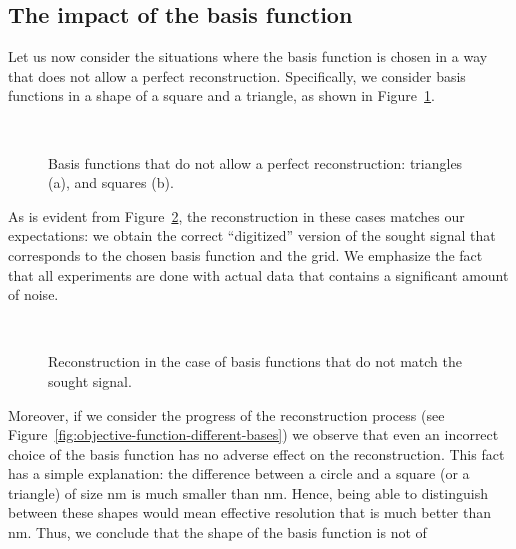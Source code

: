 \subsection{The impact of the basis function}
\label{sec:impact-basis-funct}
Let us now consider the situations where the basis function is
chosen in a way that does not allow a perfect
reconstruction. Specifically, we consider basis functions in a shape
of a square and a triangle, as shown in
Figure~\ref{fig:square-triangle-imposed}.
\begin{figure}[H]
  \centering
   \\
  \caption[Basis functions that do not allow a perfect
    reconstruction]{Basis functions that do not allow a perfect
    reconstruction: triangles (a), and squares (b).}
  \label{fig:square-triangle-imposed}
\end{figure}
As is evident from Figure~\ref{fig:square-triangle-reconstruction},
the reconstruction in these cases matches our expectations:
we obtain the correct ``digitized'' version of the sought signal that
corresponds to the chosen basis function and the grid. We emphasize the
fact that all experiments are done with actual data that contains a
significant amount of noise.
\begin{figure}[H]
  \centering
  \\
  \caption{Reconstruction in the case of basis functions that do not
    match the sought signal.}
  \label{fig:square-triangle-reconstruction}
\end{figure}
Moreover, if we consider the progress of the reconstruction process
(see Figure~\ref{fig:objective-function-different-bases}) we observe
that even an incorrect choice of the basis function has no adverse
effect on the reconstruction. This fact has a simple explanation: the
difference between a circle and a square (or a triangle) of size \unit[100]{nm}
is much smaller than \unit[100]{nm}. Hence, being able to distinguish between
these shapes would mean effective resolution that is much better than
\unit[100]{nm}. Thus, we conclude that the shape of the basis function is not of
